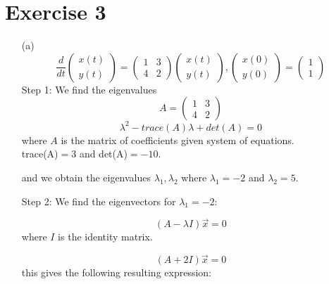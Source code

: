 \documentclass[12pt,a4paper]{article}
\begin{document}
\section*{Exercise 3}
\begin{enumerate}
  \item[(a)] 
  				\begin{equation}
									\frac{d}{dt}   \begin{pmatrix} x(t) \\ y(t) \end{pmatrix} 
									 =  \begin{pmatrix}
											1 & 3\\
											4 & 2
									\end{pmatrix} \begin{pmatrix} x(t) \\ y(t) \end{pmatrix},  \begin{pmatrix}  x(0) \\ y(0) \end{pmatrix}   =  \begin{pmatrix}  1  \\  1 \end{pmatrix} 
								\label{eq:q31}
						\end{equation}
  Step 1: We find the eigenvalues
      \[ 
        A=\begin{pmatrix} 1 & 3 \\ 4 & 2 \end{pmatrix} 
      \]
        \begin{equation}
        \lambda^2 - trace(A)\lambda + det(A)=0  \label{c4}
        \end{equation}
         where $A$ is the matrix of coefficients given system of equations.\\
         trace(A)$=3$ and det(A)$=-10$. 

        and we obtain the eigenvalues $\lambda_1,  \lambda_2$ where $\lambda_1 = -2 $ and $\lambda_2 = 5 $. 

    Step 2: We find the eigenvectors
     for   $\lambda_1 = -2 $:

      \begin{equation*}
      \left(A- \lambda I \right)\vec{x} =0 
      \end{equation*}
       where $I$ is the identity  matrix.

      \begin{equation}
      \left(A +2 I \right)\vec{x} =0 
      \end{equation}
     this gives the following resulting expression:


\end{enumerate}
\end{document}
